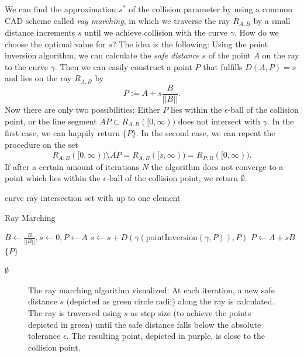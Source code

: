 \documentclass[a4paper, 11pt]{report}
\theoremstyle{definition}
\renewcommand{\emph}[1]{\textit{#1}}
\newcommand{\Desc}[2]{\State \makebox[12em][l]{#1}#2}
\begin{document}
	We can find the approximation $s^*$ of the collision parameter by using a common CAD scheme called \emph{ray marching}, in which we traverse the ray $R_{A,B}$ by a small distance increments $s$ until we achieve collision with the curve $\gamma$. How do we choose the optimal value for $s$? The idea is the following: Using the point inversion algorithm, we can calculate the \emph{safe distance} $s$ of the point $A$ on the ray to the curve $\gamma$. Then we can easily construct a point $P$ that fulfills $D(A,P) = s$ and lies on the ray $R_{A,B}$ by 
		$$ P := A+s\frac{B}{||B||}.$$
	Now there are only two possibilities: Either $P$ lies within the $\epsilon$-ball of the collision point, or the line segment $\overline{AP} \subset R_{A,B}([0,\infty))$ does not intersect with $\gamma$. In the first case, we can happily return $\{P\}$. In the second case, we can repeat the procedure on the set 
		$$ R_{A,B}([0,\infty)) \setminus \overline{AP} = R_{A,B}([s,\infty)) = R_{P,B}([0,\infty)).$$
	If after a certain amount of iterations $N$ the algorithm does not converge to a point which lies within the $\epsilon$-ball of the collision point, we return $\emptyset$.

	\begin{algorithm}[H]
		\begin{algorithmic}[1]
			\Input
				\Desc{$\gamma$}{curve}
				\Desc{$R_{A,B}$}{ray}
			\EndInput
			\Output
				\Desc{$I_{\min}$}{intersection set with up to one element}
			\EndOutput

			\caption{Ray Marching}\label{alg:raymarching}
				\State $B \gets \frac{B}{||B||}, s \gets 0, P \gets A$
					\State $s \gets s + D(\gamma(\text{pointInversion}(\gamma, P)), P)$
					\State $P \gets A + sB$
						\Return $\{P\}$
					\EndIf
				\EndFor

				\Return $\emptyset$
			\EndProcedure
		\end{algorithmic}
	\end{algorithm}

	\begin{figure}[H]
		\centering
		
		\caption{The ray marching algorithm visualized: At each iteration, a new safe distance $s$ (depicted as green circle radii) along the ray is calculated. The ray is traversed using $s$ as step size (to achieve the points depicted in green) until the safe distance falls below the absolute tolerance $\epsilon$. The resulting point, depicted in purple, is close to the collision point.}
	\end{figure}
\end{document}
